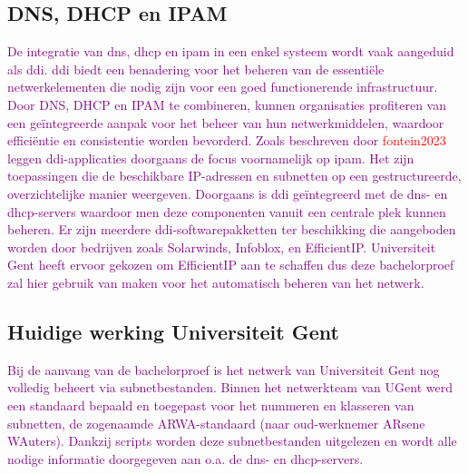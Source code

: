 \subsection{DNS, DHCP en IPAM} %
\textcolor{purple}{De integratie van \acrshort{dns}, \acrshort{dhcp} en \acrshort{ipam} in een enkel systeem wordt vaak aangeduid als \acrfull{ddi}. \acrshort{ddi} biedt een benadering voor het beheren van de essentiële netwerkelementen die nodig zijn voor een goed functionerende infrastructuur. Door DNS, DHCP en IPAM te combineren, kunnen organisaties profiteren van een geïntegreerde aanpak voor het beheer van hun netwerkmiddelen, waardoor efficiëntie en consistentie worden bevorderd. Zoals beschreven door \textcolor{red}{fontein2023} leggen \acrshort{ddi}-applicaties doorgaans de focus voornamelijk op \acrshort{ipam}. Het zijn toepassingen die de beschikbare \acrshort{IP}-adressen en subnetten op een gestructureerde, overzichtelijke manier weergeven. Doorgaans is \acrshort{ddi} geïntegreerd met de \acrshort{dns}- en \acrshort{dhcp}-servers waardoor men deze componenten vanuit een centrale plek kunnen beheren. Er zijn meerdere \acrshort{ddi}-softwarepakketten ter beschikking die aangeboden worden door bedrijven zoals Solarwinds, Infoblox, en EfficientIP. Universiteit Gent heeft ervoor gekozen om EfficientIP aan te schaffen dus deze bachelorproef zal hier gebruik van maken voor het automatisch beheren van het netwerk.}


\subsection{Huidige werking Universiteit Gent}
\textcolor{purple}{Bij de aanvang van de bachelorproef is het netwerk van Universiteit Gent nog volledig beheert via subnetbestanden. Binnen het netwerkteam van UGent werd een standaard bepaald en toegepast voor het nummeren en klasseren van subnetten, de zogenaamde ARWA-standaard (naar oud-werknemer ARsene WAuters). Dankzij scripts worden deze subnetbestanden uitgelezen en wordt alle nodige informatie doorgegeven aan o.a. de \acrshort{dns}- en \acrshort{dhcp}-servers.}

